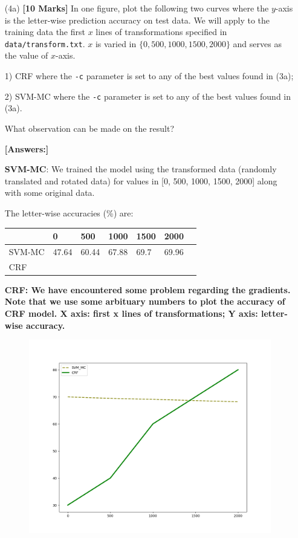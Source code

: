 \documentclass[11pt]{report}
\begin{document}
\begin{itemize}
	\item[(4a)] {\bf [10 Marks]} In one figure, plot the following two curves where the $y$-axis is the letter-wise prediction accuracy on test data.  We will apply to the training data the first $x$ lines of transformations specified in \verb#data/transform.txt#.  $x$ is varied in $\{0, 500, 1000, 1500, 2000\}$ and serves as the value of $x$-axis.
	
	1) CRF where the \verb#-c# parameter is set to any of the best values found in (3a);
	
	2) SVM-MC where the \verb#-c# parameter is set to any of the best values found in (3a).
	
	What observation can be made on the result?

	{\bf [Answers:]} 

	{\bf{SVM-MC}}: We trained the model using the transformed data (randomly translated and rotated data) for values in [0, 500, 1000, 1500, 2000] along with some original data. 

 	The letter-wise accuracies (\%) are: 
	\begin{table}[h]
	\centering
	\begin{tabular}{lllllll}
	          & 0     & 500    & 1000   & 1500  & 2000  \\ %
	\hline
	SVM-MC     & 47.64 & 60.44 & 67.88 & 69.7 & 69.96 \\ %
	CRF        &       &       &       &       &       \\
	\hline
	\end{tabular}
	\end{table}

	{\bf{CRF: We have encountered some problem regarding the gradients. Note that we use some arbituary numbers to plot the accuracy of CRF model. X axis: first x lines of transformations; Y axis: letter-wise accuracy.}}

	\begin{figure}[h]
	\includegraphics[width = 10 cm]{./letteraccuracies2.png}
	\centering
	\end{figure}
	

\end{itemize}
\end{document}
